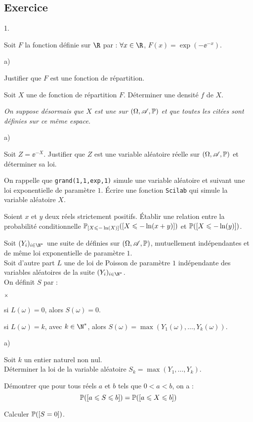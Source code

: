\documentclass[11pt]{article}%
\begin{document}
\subsection*{Exercice} %
\noindent
\begin{noliste}{1.}
 \item Soit $F$ la fonction définie sur $\R$ par : $\forall x\in\R$, 
 $F(x)=\exp\left(-\ee^{-x}\right)$.
 \begin{noliste}{a)}
  \item Justifier que $F$ est une fonction de répartition.
  \item Soit $X$ une \var de fonction de répartition $F$. Déterminer 
  une densité $f$ de $X$.
 \end{noliste}
 {\it On suppose désormais que $X$ est une \var sur $(\Omega, \mathscr{A}, 
 \mathbb{P})$ et que toutes les \var citées sont définies sur ce même 
 espace.}
 
 \item 
 \begin{noliste}{a)}
  \item Soit $Z=\ee^{-X}$. Justifier que $Z$ est une variable aléatoire 
  réelle sur $(\Omega, \mathscr{A}, \mathbb{P})$ et déterminer sa loi.
  \item On rappelle que {\tt grand(1,1,\ttq{}exp\ttq{},1)} simule
    une variable aléatoire et suivant une loi
    exponentielle de paramètre $1$. Écrire une
    fonction {\tt Scilab} qui simule la variable
    aléatoire $X$.
  \item Soient $x$ et $y$ deux réels strictement positifs. Établir une 
  relation entre la probabilité conditionnelle 
  $\mathbb{P}_{\left[ {X\leqslant -\ln(X)} \right]}(\left[ {X\leqslant -\ln(x+y)} \right])$ et 
  $\mathbb{P}(\left[ {X\leqslant - \ln(y)} \right])$.
 \end{noliste}
 
 \item Soit $(Y_i)_{i\in\N^*}$ une suite de \var définies sur $(\Omega, 
 \mathscr{A}, \mathbb{P})$, mutuellement indépendantes et de même loi exponentielle 
 de paramètre $1$.\\
 Soit d'autre part $L$ une \var de loi de Poisson de paramètre $1$ 
 indépendante des variables aléatoires de la suite $(Y_i)_{i\in\N^*}$.\\
 On définit $S$ par :
 \begin{noliste}{$\scriptstyle \times$}
  \item si $L(\omega)=0$, alors $S(\omega)=0$.
  \item si $L(\omega)=k$, avec $k\in\N^*$, alors $S(\omega) = 
  \max(Y_1(\omega), \hdots, Y_k(\omega))$.
 \end{noliste}
 \begin{noliste}{a)}
  \item Soit $k$ un entier naturel non nul.\\
  Déterminer la loi de la variable aléatoire $S_k=\max(Y_1,\hdots, 
  Y_k)$.
  \item Démontrer que pour tous réels $a$ et $b$ tels que $0<a<b$, 
  on a :
  \[
   \mathbb{P}(\left[ {a\leqslant S \leqslant b} \right]) = \mathbb{P}(\left[ {a\leqslant X \leqslant b} \right])
  \]
  \item Calculer $\mathbb{P}(\left[ {S=0} \right])$.
 \end{noliste}
\end{noliste}
\end{document}
